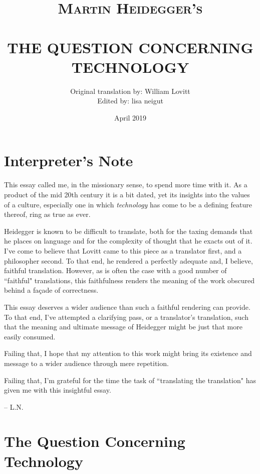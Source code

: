 \documentclass[paper=a4, fontsize=11pt,twoside]{scrartcl}
\title{	\normalsize \textsc{Martin Heidegger's} 
		 	\\[.5cm]								%
			\HRule{0.5pt} \\						%
			\LARGE \textbf{\uppercase{The Question Concerning Technology}}	%
			\HRule{2pt} \\ [0.5cm]		%
		}
\author{
		Original translation by: William Lovitt\\	
		Edited by: lisa neigut\\
}
\date{April 2019}
\makeatletter
\def\printtitle{%
    {\centering \@title\par}}
\def\printauthor{%
    {\centering \large \@author}}
\makeatother
\begin{document}
\thispagestyle{empty}		%

\printtitle					%
  	\vfill
\printauthor				%
\newpage
\setcounter{page}{1}		%
\section*{Interpreter's Note}

\vspace{3.0cm}
This essay called me, in the missionary sense, to spend more time with it. As a product of the mid 20th century it is a bit dated, yet its insights into the values of a culture, especially one in which \textit{technology} has come to be a defining feature thereof, ring as true as ever.

Heidegger is known to be difficult to translate, both for the taxing demands that he places on language and for the complexity of thought that he exacts out of it.  I've come to believe that Lovitt came to this piece as a translator first, and a philosopher second. To that end, he rendered a perfectly adequate and, I believe, faithful translation. However, as is often the case with a good number of ``faithful" translations, this faithfulness renders the meaning of the work obscured behind a fa\c{c}ade of correctness.

This essay deserves a wider audience than such a faithful rendering can provide. To that end, I've attempted a clarifying pass, or a translator's translation, such that the meaning and ultimate message of Heidegger might be just that more easily consumed.

Failing that, I hope that my attention to this work might bring its existence and message to a wider audience through mere repetition.

Failing that, I'm grateful for the time the task of ``translating the translation" has given me with this insightful essay.

\begin{flushright}
-- L.N.
\end{flushright}

\vfill
\section*{The Question Concerning Technology}
\end{document}
